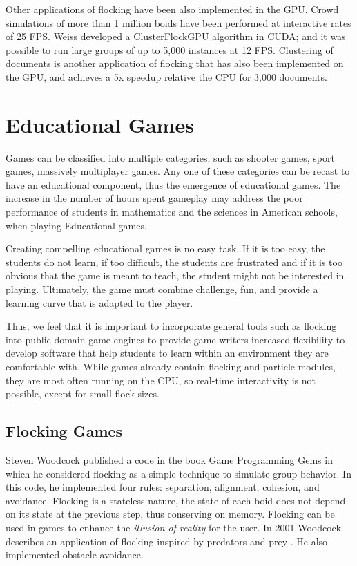 Other applications of flocking have been also implemented in the GPU.  Crowd simulations of more than 1 million boids have been performed at interactive rates of 25 FPS\cite{supermassiveCrowd}. Weiss developed a ClusterFlockGPU algorithm in CUDA; and it was possible to run large groups of up to 5,000 instances at 12 FPS\cite{SI_GPU}. Clustering of documents is another application of flocking that has also been implemented on the GPU, and achieves a 5x speedup relative the CPU for 3,000 documents\cite{document2}. 

\section{Educational Games}
Games can be classified into multiple categories, such as shooter games, sport games, massively multiplayer games. Any one of these categories can be recast to have an educational component, thus the emergence of educational games. The increase in the number of hours spent gameplay may address the poor performance of students in mathematics and the sciences in American schools, when playing Educational games. 

 Creating compelling educational games is no easy task. If it is too easy, the students do not learn, if too difficult, the students are frustrated and if it is too obvious that the game is meant to teach, the student might not be interested in playing. Ultimately, the game must combine challenge, fun, and provide a learning curve that is adapted to the player.

Thus, we feel that it is important to incorporate general tools such as flocking into public domain game engines to provide game writers increased flexibility to develop software that help students to learn within an environment they are comfortable with. While games already contain flocking and particle modules, they are most often running on the CPU, so real-time interactivity is not possible, except for small flock sizes. 

\subsection{Flocking Games}
Steven Woodcock published a code in the book Game Programming Gems in which he considered flocking as a simple technique to simulate group behavior\cite{gems1}. In this code, he implemented four rules: separation, alignment, cohesion, and avoidance.  Flocking is a stateless nature, the state of each boid does not depend on its state at the previous step, thus conserving on memory. Flocking can be used in games to enhance the \textit{illusion of reality} for the user.  In 2001 Woodcock describes an application of flocking inspired by predators and prey \cite{gems2}. 
He also implemented obstacle avoidance.

